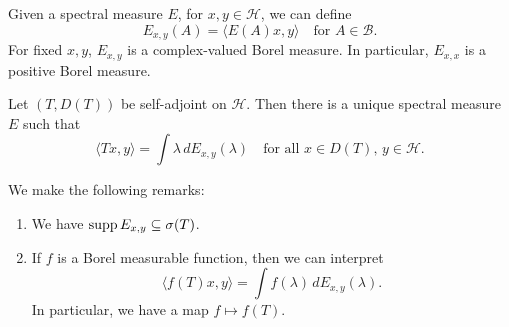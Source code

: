 \begin{remark}
  Given a spectral measure $E$, for $x, y \in \mathcal{H}$,
  we can define
  \[
    E_{x, y}(A) = \langle E(A) x, y \rangle \quad
    \text{for $A \in \mathcal{B}$}.
  \]
  For fixed $x, y$,
  $E_{x, y}$ is a complex-valued Borel measure. In particular,
  $E_{x, x}$ is a positive Borel measure.
\end{remark}

\begin{theorem}
  Let $(T, D(T))$ be self-adjoint on $\mathcal{H}$. Then
  there is a unique spectral measure $E$ such that
  \[
    \langle Tx, y \rangle
    = \int \lambda \, dE_{x, y}(\lambda)
    \quad \text{for all $x \in D(T)$, $y \in \mathcal{H}$}.
  \]
\end{theorem}

\begin{remark}
  We make the following remarks:
  \begin{enumerate}
    \item We have $\operatorname{supp} E_{x, y} \subseteq \sigma(T)$.
    \item If $f$ is a Borel measurable function, then
      we can interpret
      \[
        \langle f(T) x, y \rangle
        = \int f(\lambda) \, dE_{x, y}(\lambda).
      \]
      In particular, we have a map
      $f \mapsto f(T)$.
  \end{enumerate}
\end{remark}
